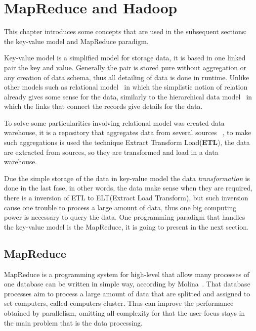 \chapter{MapReduce and Hadoop} %
\label{cha:background}

This chapter introduces some concepts that are used in the subsequent sections:
the key-value model and MapReduce paradigm.

Key-value model is a simplified model for storage data, it is based in one linked
pair the key and value. Generally the pair is stored pure without aggregation or
any creation of data schema, thus all detailing of data is done in runtime. Unlike
other models such as relational model~\cite{codd:1970} in which the simplistic notion
of relation already gives some sense for the data, similarly to the hierarchical
data model~\cite{silber:2005} in which the links that connect the records give
details for the data.

To solve some particularities involving relational model was created data warehouse,
it is a repository that aggregates data from several sources ~\cite{silber:2005},
to make such aggregations is used the technique Extract Transform Load(\textbf{ETL}),
the data are extracted from sources, so they are transformed and load in a data
warehouse.

Due the simple storage of the data in key-value model the data \textit{transformation}
is done in the last fase, in other words, the data make sense when they are required,
there is a inversion of ETL to ELT(Extract Load Transform), but such inversion
cause one trouble to process a large amount of data, thus one big computing
power is necessary to query the data. One programming paradigm that handles the
key-value model is the MapReduce, it is going to present in the next section.

\section{MapReduce}\label{section:mapreduce}
MapReduce is a programming system for high-level that allow many processes of one
database can be written in simple way, according by Molina~\cite{molina:2009}.
That database processes aim to process a large amount of data that are splitted
and assigned to set computers, called computers cluster. Thus can improve the
performance obtained by parallelism, omitting all complexity for that the user
focus stays in the main problem that is the data processing.

